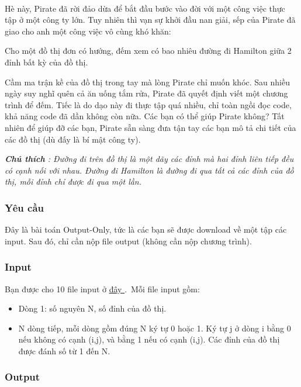 

 

Hè này, Pirate đã rời đảo dừa để bắt đầu bước vào đời với một công việc thực tập ở một công ty lớn. Tuy nhiên thì vạn sự khởi đầu nan giải, sếp của Pirate đã giao cho anh một công việc vô cùng khó khăn:

Cho một đồ thị đơn có hướng, đếm xem có bao nhiêu đường đi Hamilton giữa 2 đỉnh bất kỳ của đồ thị.

Cầm ma trận kề của đồ thị trong tay mà lòng Pirate chỉ muốn khóc. Sau nhiều ngày suy nghĩ quên cả ăn uống tắm rửa, Pirate đã quyết định viết một chương trình để đếm. Tiếc là do dạo này đi thực tập quá nhiều, chỉ toàn ngồi đọc code, khả năng code đã dần không còn nữa. Các bạn có thể giúp Pirate không? Tất nhiên để giúp đỡ các bạn, Pirate sẵn sàng đưa tận tay các bạn mô tả chi tiết của các đồ thị (dù đấy là bí mật công ty).

\emph{\textbf{Chú thích } : Đường đi trên đồ thị là một dãy các đỉnh mà hai đỉnh liên tiếp đều có cạnh nối với nhau. Đường đi Hamilton là đường đi qua tất cả các đỉnh của đồ thị, mỗi đỉnh chỉ được đi qua một lần. }

\subsubsection{Yêu cầu}

Đây là bài toán Output-Only, tức là các bạn sẽ được download về một tập các input. Sau đó, chỉ cần nộp file output (không cần nộp chương trình).

\subsubsection{Input}

Bạn được cho 10 file input ở \href{https://www.dropbox.com/s/rsc403hk54lye08/VMCOUNT.zip?dl=0}{ đây } . Mỗi file input gồm:
\begin{itemize}
	\item Dòng 1: số nguyên N, số đỉnh của đồ thị.
	\item N dòng tiếp, mỗi dòng gồm đúng N ký tự 0 hoặc 1. Ký tự j ở dòng i bằng 0 nếu không có cạnh (i,j), và bằng 1 nếu có cạnh (i,j). Các đỉnh của đồ thị được đánh số từ 1 đến N.
\end{itemize}

\subsubsection{Output}

